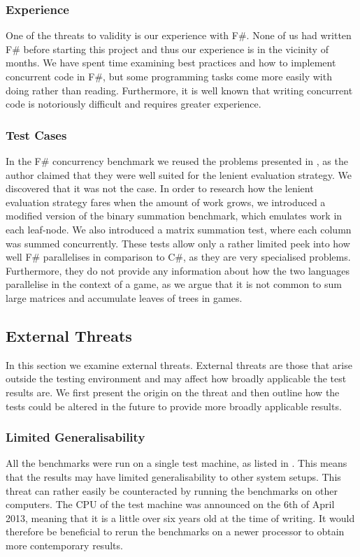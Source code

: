 \subsubsection{Experience}
One of the threats to validity is our experience with F\#. None of us had written F\# before starting this project and thus our experience is in the vicinity of months. We have spent time examining best practices and how to implement concurrent code in F\#, but some programming tasks come more easily with doing rather than reading. Furthermore, it is well known that writing concurrent code is notoriously difficult and requires greater experience\cite{nanz2013benchmarking,nanz2013examining}. 

\subsubsection{Test Cases}
In the F\# concurrency benchmark we reused the problems presented in \cite{DBLP:journals/cl/Tremblay-parallel}, as the author claimed that they were well suited for the lenient evaluation strategy. We discovered that it was not the case. In order to research how the lenient evaluation strategy fares when the amount of work grows, we introduced a modified version of the binary summation benchmark, which emulates work in each leaf-node. We also introduced a matrix summation test, where each column was summed concurrently. These tests allow only a rather limited peek into how well F\# parallelises in comparison to C\#, as they are very specialised problems. Furthermore, they do not provide any information about how the two languages parallelise in the context of a game, as we argue that it is not common to sum large matrices and accumulate leaves of trees in games.

\subsection{External Threats}
In this section we examine external threats. External threats are those that arise outside the testing environment and may affect how broadly applicable the test results are. We first present the origin on the threat and then outline how the tests could be altered in the future to provide more broadly applicable results.

\subsubsection{Limited Generalisability}
All the benchmarks were run on a single test machine, as listed in . This means that the results may have limited generalisability to other system setups. This threat can rather easily be counteracted by running the benchmarks on other computers. The \gls{CPU} of the test machine was announced on the 6th of April 2013\cite{i7:specs}, meaning that it is a little over six years old at the time of writing. It would therefore be beneficial to rerun the benchmarks on a newer processor to obtain more contemporary results. 
